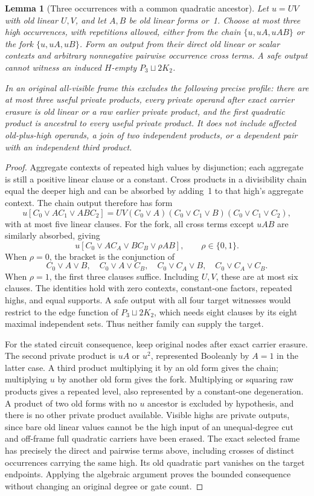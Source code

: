 \documentclass[11pt]{article}
\newtheorem{lemma}[theorem]{Lemma}
\theoremstyle{definition}
\theoremstyle{remark}
\begin{document}
\begin{lemma}[Three occurrences with a common quadratic ancestor]\label{lem:commonancestorpath}
Let $u=UV$ with old linear $U,V$, and let $A,B$ be old linear forms or~1. Choose at most three high occurrences, with repetitions allowed, either from the chain $\{u,uA,uAB\}$ or the fork $\{u,uA,uB\}$. Form an output from their direct old linear or scalar contexts and arbitrary nonnegative pairwise occurrence cross terms. A safe output cannot witness an induced $H$-empty $P_3\sqcup2K_2$.

In an original all-visible frame this excludes the following precise profile: there are at most three useful private products, every private operand after exact carrier erasure is old linear or a raw earlier private product, and the first quadratic product is ancestral to every useful private product. It does not include affected old-plus-high operands, a join of two independent products, or a dependent pair with an independent third product.
\end{lemma}
\begin{proof}
Aggregate contexts of repeated high values by disjunction; each aggregate is still a positive linear clause or a constant. Cross products in a divisibility chain equal the deeper high and can be absorbed by adding~1 to that high's aggregate context. The chain output therefore has form
\[
 u[C_0\vee AC_1\vee ABC_2]
 =UV(C_0\vee A)(C_0\vee C_1\vee B)(C_0\vee C_1\vee C_2),
\]
with at most five linear clauses. For the fork, all cross terms except $uAB$ are similarly absorbed, giving
\[
 u[C_0\vee AC_A\vee BC_B\vee\rho AB],\qquad\rho\in\{0,1\}.
\]
When $\rho=0$, the bracket is the conjunction of
\[
 C_0\vee A\vee B,\quad C_0\vee A\vee C_B,\quad
 C_0\vee C_A\vee B,\quad C_0\vee C_A\vee C_B.
\]
When $\rho=1$, the first three clauses suffice. Including $U,V$, these are at most six clauses. The identities hold with zero contexts, constant-one factors, repeated highs, and equal supports. A safe output with all four target witnesses would restrict to the edge function of $P_3\sqcup2K_2$, which needs eight clauses by its eight maximal independent sets. Thus neither family can supply the target.

For the stated circuit consequence, keep original nodes after exact carrier erasure. The second private product is $uA$ or $u^2$, represented Booleanly by $A=1$ in the latter case. A third product multiplying it by an old form gives the chain; multiplying $u$ by another old form gives the fork. Multiplying or squaring raw products gives a repeated level, also represented by a constant-one degeneration. A product of two old forms with no $u$ ancestor is excluded by hypothesis, and there is no other private product available. Visible highs are private outputs, since bare old linear values cannot be the high input of an unequal-degree cut and off-frame full quadratic carriers have been erased. The exact selected frame has precisely the direct and pairwise terms above, including crosses of distinct occurrences carrying the same high. Its old quadratic part vanishes on the target endpoints. Applying the algebraic argument proves the bounded consequence without changing an original degree or gate count.
\end{proof}
\end{document}
